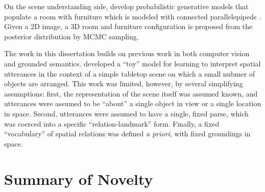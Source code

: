 \documentclass[12pt]{article}
\begin{document}
On the scene understanding side, \cite{delpero2011sampling, delpero2012bayesian} develop probabilistic generative models that populate a room with furniture which is modeled with connected parallelepipeds \citep{schlecht2009learning}.  Given a 2D image, a 3D room and furniture configuration is proposed from the posterior distribution by MCMC sampling.

The work in this dissertation builds on previous work in both computer vision and grounded semantics.  \cite{dawson2013spatial} developed a ``toy'' model for learning to interpret spatial utterances in the context of a simple tabletop scene on which a small nubmer of objects are arranged.  This work was limited, however, by several simplifying assumptions: first, the representation of the scene itself was assumed known, and utterances were assumed to be ``about'' a single object in view or a single location in space.  Second, utterances were assumed to have a single, fixed parse, which was coerced into a specific ``relation-landmark'' form.  Finally, a fixed ``vocabulary'' of spatial relations was defined {\it a priori}, with fixed groundings in space.

\section{Summary of Novelty}
\end{document}

